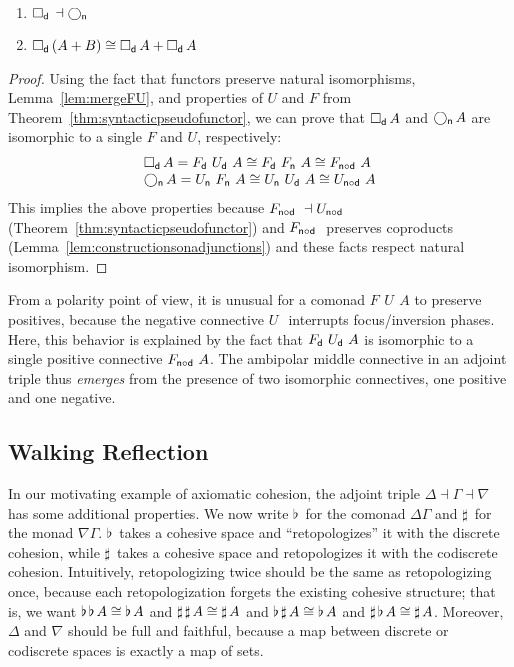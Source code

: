 \documentclass{drl-common/llncs}
\newcommand{\la}{\ensuremath{\dashv}}
\newcommand\compo[2]{\ensuremath{#1 \circ #2}}
\newcommand\F[2]{\ensuremath{F_{#1} \,\, #2}}
\newcommand\U[2]{\ensuremath{U_{#1} \,\, #2}}
\newcommand\coprd[2]{\ensuremath{#1 + #2}}
\newcommand\Bx[2]{\ensuremath{\Box_{#1} \, {#2}}}
\newcommand\Crc[2]{\ensuremath{\bigcirc_{#1} \, {#2}}}
\newcommand\Flat[1]{\ensuremath{\flat \, {#1}}}
\newcommand\Sharp[1]{\ensuremath{\sharp \, {#1}}}
\begin{document}
\begin{theorem} \label{thm:adjointtriple}
\begin{enumerate}
\item $\Bx{\dsd{d}}{} \la \Crc{\dsd{n}}{}$ 
\item $\Bx{\dsd{d}}{(\coprd A B)} \iso \coprd{\Bx{\dsd{d}}{A}}{\Bx{\dsd{d}}{A}}$
\end{enumerate}
\end{theorem}

\begin{proof}
Using the fact that functors preserve natural isomorphisms,
Lemma~\ref{lem:mergeFU}, and properties of $U$ and $F$ from
Theorem~\ref{thm:syntacticpseudofunctor}, we can prove that \Bx{\dsd d}{A}
and \Crc{\dsd n}{A} are isomorphic to a single $F$ and $U$, 
respectively:
\[
\begin{array}{l}
\Bx{\dsd d}{A} = \F{\dsd{d}}{\U{\dsd d}{A}} \cong \F{\dsd d}{\F{\dsd n}{A}} \cong \F{\compo{\dsd{n}}{\dsd{d}}}{A}\\
\Crc{\dsd{n}}{A} = \U{\dsd{n}}{\F{\dsd n}{A}} \cong \U{\dsd n}{\U{\dsd d}{A}} \cong \U{\compo{\dsd{n}}{\dsd d}}{A}
\end{array}
\]
This implies the above properties because 
$\F{\compo{\dsd{n}}{\dsd{d}}}{} \la \U{\compo{\dsd{n}}{\dsd d}}{}$
(Theorem~\ref{thm:syntacticpseudofunctor})
and $\F{\compo{\dsd{n}}{\dsd{d}}}$ preserves coproducts
(Lemma~\ref{lem:constructionsonadjunctions}) 
and these facts respect natural isomorphism.  
\end{proof}

From a polarity point of view, it is unusual for a comonad
$\F{}{\U{}{A}}$ to preserve positives, because the negative connective
$\U{}{}$ interrupts focus/inversion phases.  Here, this behavior is
explained by the fact that $\F{\dsd{d}}{\U{\dsd{d}}{A}}$ is isomorphic
to a single positive connective $\F{\compo{\dsd n}{\dsd d}}{A}$.  The
ambipolar middle connective in an adjoint triple thus \emph{emerges}
from the presence of two isomorphic connectives, one positive and one
negative.

\subsection{Walking Reflection}

In our motivating example of axiomatic cohesion, the adjoint triple
$\Delta \la \Gamma \la \nabla$ has some additional properties.  We now
write $\Flat{}$ for the comonad $\Delta\Gamma$ and $\Sharp{}$ for the
monad $\nabla\Gamma$. $\Flat{}$ takes a cohesive space and
``retopologizes'' it with the discrete cohesion, while $\Sharp{}$ takes
a cohesive space and retopologizes it with the codiscrete cohesion.
Intuitively, retopologizing twice should be the same as retopologizing
once, because each retopologization forgets the existing cohesive
structure; that is, we want $\Flat{\Flat{A}} \iso \Flat A$ and
$\Sharp{\Sharp{A}} \iso \Sharp A$ and $\Flat{\Sharp{A}} \iso \Flat A$ and
$\Sharp{\Flat{A}} \iso \Sharp A$.  Moreover, $\Delta$ and $\nabla$ should
be full and faithful, because a map between discrete or codiscrete
spaces is exactly a map of sets.
\end{document}

